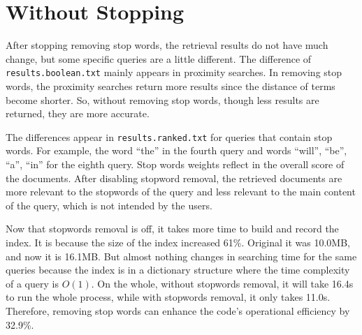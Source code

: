\section{Without Stopping}

After stopping removing stop words, the retrieval results do not have much change, but some specific queries are a little different. The difference of \texttt{results.boolean.txt} mainly appears in proximity searches. In removing stop words, the proximity searches return more results since the distance of terms become shorter. So, without removing stop words, though less results are returned, they are more accurate.

The differences appear in \texttt{results.ranked.txt} for queries that contain stop words. For example, the word ``the'' in the fourth query and words ``will'', ``be'', ``a'', ``in'' for the eighth query. Stop words weights reflect in the overall score of the documents. After disabling stopword removal, the retrieved documents are more relevant to the stopwords of the query and less relevant to the main content of the query, which is not intended by the users.

Now that stopwords removal is off, it takes more time to build and record the index. It is because the size of the index increased 61\%. Original it was 10.0MB, and now it is 16.1MB.
But almost nothing changes in searching time for the same queries because the index is in a dictionary structure where the time complexity of a query is $O(1)$. On the whole, without stopwords removal, it will take 16.4s to run the whole process, while with stopwords removal, it only takes 11.0s. Therefore, removing stop words can enhance the code's operational efficiency by 32.9\%. 